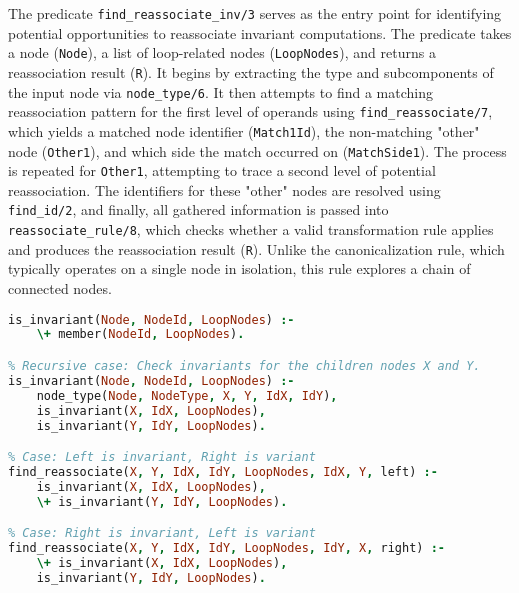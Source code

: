 The predicate \texttt{find\_reassociate\_inv/3} serves as the entry point for identifying potential opportunities to reassociate invariant computations. The predicate takes a node (\texttt{Node}), a list of loop-related nodes (\texttt{LoopNodes}), and returns a reassociation result (\texttt{R}). It begins by extracting the type and subcomponents of the input node via \texttt{node\_type/6}. It then attempts to find a matching reassociation pattern for the first level of operands using \texttt{find\_reassociate/7}, which yields a matched node identifier (\texttt{Match1Id}), the non-matching "other" node (\texttt{Other1}), and which side the match occurred on (\texttt{MatchSide1}). The process is repeated for \texttt{Other1}, attempting to trace a second level of potential reassociation. The identifiers for these "other" nodes are resolved using \texttt{find\_id/2}, and finally, all gathered information is passed into \texttt{reassociate\_rule/8}, which checks whether a valid transformation rule applies and produces the reassociation result (\texttt{R}). Unlike the canonicalization rule, which typically operates on a single node in isolation, this rule explores a chain of connected nodes.
\smallbreak
\begin{lstlisting}[language=Prolog]
% Base case: NodeId should not be in LoopNodes.
is_invariant(Node, NodeId, LoopNodes) :-
    \+ member(NodeId, LoopNodes).

% Recursive case: Check invariants for the children nodes X and Y.
is_invariant(Node, NodeId, LoopNodes) :-
    node_type(Node, NodeType, X, Y, IdX, IdY),
    is_invariant(X, IdX, LoopNodes),
    is_invariant(Y, IdY, LoopNodes).

% Case: Left is invariant, Right is variant
find_reassociate(X, Y, IdX, IdY, LoopNodes, IdX, Y, left) :-
    is_invariant(X, IdX, LoopNodes),
    \+ is_invariant(Y, IdY, LoopNodes).

% Case: Right is invariant, Left is variant
find_reassociate(X, Y, IdX, IdY, LoopNodes, IdY, X, right) :-
    \+ is_invariant(X, IdX, LoopNodes),
    is_invariant(Y, IdY, LoopNodes).
\end{lstlisting}

